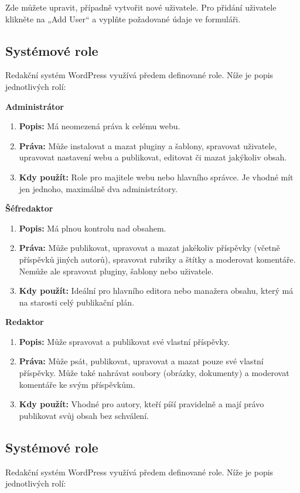 \documentclass[12pt,a4paper]{article}
\begin{document}
	\newpage
	Zde můžete upravit, případně vytvořit nové uživatele. Pro přidání uživatele klikněte na „Add User“ a vyplňte požadované údaje ve formuláři.
	
	\subsection{Systémové role}
	Redakční systém WordPress využívá předem definované role. Níže je popis jednotlivých rolí:
	
	\textbf{Administrátor}
	\begin{enumerate}
		\item \textbf{Popis:} Má neomezená práva k celému webu.
		\item \textbf{Práva:} Může instalovat a mazat pluginy a šablony, spravovat uživatele, upravovat nastavení webu a publikovat, editovat či mazat jakýkoliv obsah.
		\item \textbf{Kdy použít:} Role pro majitele webu nebo hlavního správce. Je vhodné mít jen jednoho, maximálně dva administrátory.
	\end{enumerate}
	
	\textbf{Šéfredaktor}
	\begin{enumerate}
		\item \textbf{Popis:} Má plnou kontrolu nad obsahem.
		\item \textbf{Práva:} Může publikovat, upravovat a mazat jakékoliv příspěvky (včetně příspěvků jiných autorů), spravovat rubriky a štítky a moderovat komentáře. Nemůže ale spravovat pluginy, šablony nebo uživatele.
		\item \textbf{Kdy použít:} Ideální pro hlavního editora nebo manažera obsahu, který má na starosti celý publikační plán.
	\end{enumerate}
	
	\textbf{Redaktor}
	\begin{enumerate}
		\item \textbf{Popis:} Může spravovat a publikovat své vlastní příspěvky.
		\item \textbf{Práva:} Může psát, publikovat, upravovat a mazat pouze své vlastní příspěvky. Může také nahrávat soubory (obrázky, dokumenty) a moderovat komentáře ke svým příspěvkům.
		\item \textbf{Kdy použít:} Vhodné pro autory, kteří píší pravidelně a mají právo publikovat svůj obsah bez schválení.
	\end{enumerate}\subsection{Systémové role}
	Redakční systém WordPress využívá předem definované role. Níže je popis jednotlivých rolí:
	
\end{document}
